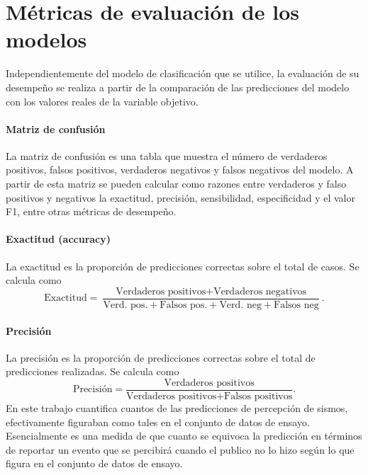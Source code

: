 \documentclass[a4paper]{report}
\begin{document}


\section{Métricas de evaluación de los modelos}\label{sec:métricas}

Independientemente del modelo de clasificación que se utilice, la evaluación de su desempeño se realiza a partir de la comparación de las predicciones del modelo con los valores reales de la variable objetivo.


\paragraph{Matriz de confusión}
La matriz de confusión es una tabla que muestra el número de verdaderos positivos, falsos positivos, verdaderos negativos y falsos negativos del modelo.
A partir de esta matriz se pueden calcular como razones entre verdaderos y falso positivos y negativos la exactitud, precisión, sensibilidad, especificidad y el valor F1, entre otras métricas de desempeño.


\paragraph{Exactitud (accuracy)}
La exactitud es la proporción de predicciones correctas sobre el total de casos.
Se calcula como
\begin{equation}
	\text{Exactitud} = \frac{\text{Verdaderos positivos} + \text{Verdaderos negativos}}{\text{Verd. pos.} + \text{Falsos pos.} + \text{Verd. neg} + \text{Falsos neg}}.
\end{equation}


\paragraph{Precisión}
La precisión es la proporción de predicciones correctas sobre el total de predicciones realizadas.
Se calcula como
\begin{equation}
	\text{Precisión} = \frac{\text{Verdaderos positivos}}{\text{Verdaderos positivos} + \text{Falsos positivos}}.
\end{equation}
En este trabajo cuantifica cuantos de las predicciones de percepción de sismos, efectivamente figuraban como tales en el conjunto de datos de ensayo.
Esencialmente es una medida de que cuanto se equivoca la predicción en términos de reportar un evento que se percibirá cuando el publico no lo hizo según lo que figura en el conjunto de datos de ensayo.
\end{document}
